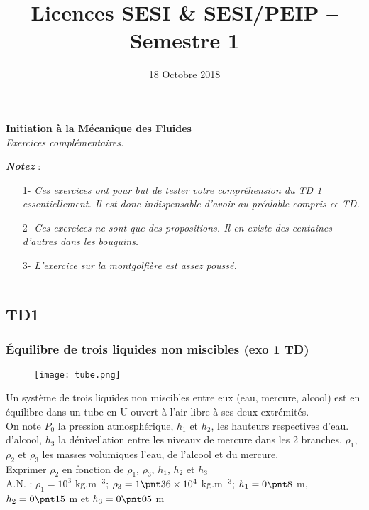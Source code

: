 \documentclass[a4paper,12pt]{article}
\title{\large{Licences SESI \& SESI/PEIP -- Semestre 1}}%
\date{\large{18 Octobre 2018}}
\newcommand\bk{\color{black}}
\newcommand\brick{\color{brick}}
\newcommand\navy{\color{navy}}
\begin{document}
\begin{center}
	\large{\textbf{Initiation à la Mécanique des Fluides}} \\[1mm]
	\textit{Exercices complémentaires.}
\end{center}

\textbf{\textit{Notez}} : 
	\begin{itemize}[leftmargin=1.4cm]
		\item[1-] \textit{Ces exercices ont pour but de tester votre compréhension du TD 1 essentiellement. Il est donc indispensable d'avoir au préalable compris ce TD.}
 		\item[2-] \textit{ Ces exercices ne sont que des propositions. Il en existe des centaines d'autres dans les bouquins.}
		\item[3-] \textit{L'exercice sur la montgolfière est assez poussé.}
\end{itemize}
\hrule
\vspace{2mm}

\brick \subsection*{TD1} \bk

\navy \subsubsection*{Équilibre de trois liquides non miscibles (exo 1 TD)} \bk

\begin{wrapfigure}{R}{0.24\textwidth}
	\vspace{-1cm}
	\texttt{[image: tube.png]}
\end{wrapfigure}

Un système 	de trois liquides non miscibles entre eux (eau, mercure, alcool) est en équilibre dans un tube en U ouvert à l'air libre à ses deux extrémités. \\[2mm]
On note $P_0$ la pression atmosphérique, $h_1$ et $h_2$, les hauteurs respectives d'eau. d'alcool, $h_3$ la dénivellation entre les niveaux de mercure dans les 2 branches, $\rho_1$, $\rho_2$ et $\rho_3$ les masses volumiques l'eau, de l'alcool et du mercure. \\

Exprimer $\rho_2$ en fonction de $\rho_1$, $\rho_3$, $h_1$, $h_2$ et $h_3$\\
A.N. : $\rho_1 = 10^3$ kg.m$^{-3}$; $\rho_3 = 1\pnt36 \times 10^4$ kg.m$^{-3}$; $h_1=0\pnt8$ m, $h_2=0\pnt15$ m et $h_3=0\pnt05$ m
\end{document}
